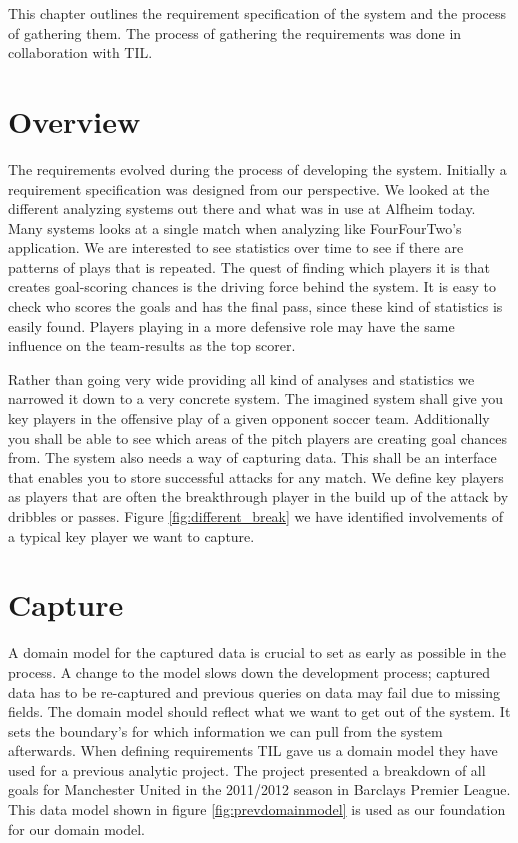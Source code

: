 This chapter outlines the requirement specification of the system and the process of gathering them. The process of gathering the requirements was done in collaboration with \ac{TIL}.

\section{Overview}
The requirements evolved during the process of developing the system. Initially a requirement specification was designed from our perspective. We looked at the different analyzing systems out there and what was in use at Alfheim today. Many systems looks at a single match when analyzing like FourFourTwo's application. We are interested to see statistics over time to see if there are patterns of plays that is repeated. The quest of finding which players it is that creates goal-scoring chances is the driving force behind the system. It is easy to check who scores the goals and has the final pass, since these kind of statistics is easily found. Players playing in a more defensive role may have the same influence on the team-results as the top scorer.

Rather than going very wide providing all kind of analyses and statistics we narrowed it down to a very concrete system. The imagined system shall give you key players in the offensive play of a given opponent soccer team. Additionally you shall be able to see which areas of the pitch players are creating goal chances from. The system also needs a way of capturing data. This shall be an interface that enables you to store successful attacks for any match. We define key players as players that are often the breakthrough player in the build up of the attack by dribbles or passes. Figure \ref{fig:different_break} we have identified involvements of a typical key player we want to capture.

\section{Capture}

A domain model for the captured data is crucial to set as early as possible in the process. A change to the model slows down the development process; captured data has to be re-captured and previous queries on data may fail due to missing fields. The domain model should reflect what we want to get out of the system. It sets the boundary's for which information we can pull from the system afterwards. When defining requirements \ac{TIL} gave us a domain model they have used for a previous analytic project. The project presented a breakdown of all goals for Manchester United in the 2011/2012 season in Barclays Premier League. This data model shown in figure \ref{fig:prevdomainmodel} is used as our foundation for our domain model. 

